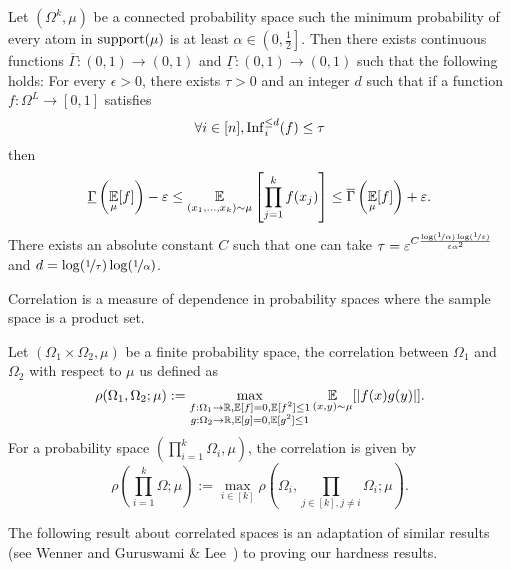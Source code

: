 \begin{theorem}

	\label{thm:invariance}
	Let $(\Omega^k, \mu)$ be a connected probability space such the minimum probability of
	every atom in $\supp(\mu)$ is at least $\alpha \in \left(0, \frac{1}{2}\right]$.
	 Then there exists 
	continuous functions $\overline{\Gamma} : (0,1)\rightarrow (0,1)$ and 
	$\underline{\Gamma} : (0,1)\rightarrow (0,1)$ such that the following holds: 
	For every $\epsilon>0$, there exists $\tau > 0$ and an integer $d$ such that 
	if a function $f : \Omega^L \rightarrow [0,1]$ satisfies
	$$\forall i\in [n],  \Inf_i^{\leq d} (f) \leq \tau $$
	then 
	$$\underline{\Gamma}\left(\E_\mu[f]\right) -\epsilon \leq \E_{(x_1,\ldots, x_k) \sim \mu}\left[
	\prod_{j=1}^k f(x_j)\right] \leq \overline{\Gamma}\left(\E_\mu[f]\right) + \epsilon.$$
	There exists an absolute constant $C$ such that one can take $\tau = \epsilon^
	{C\frac{\log(\nicefrac{1}{\alpha})\log(\nicefrac{1}{\epsilon})}{\epsilon
	\alpha^2}}$ and $d = \log(\nicefrac{1}{\tau})\log(\nicefrac{1}{\alpha})$.
\end{theorem}

Correlation is a measure of dependence in probability spaces where the sample space
is a product set.

\begin{definition}
\label{def:correlation}
Let $(\Omega_1 \times \Omega_2, \mu)$ be a finite probability space, the correlation between $\Omega_1$ and $\Omega_2$ with respect to $\mu$ us defined as 
$$\rho(\Omega_1, \Omega_2; \mu) := \mathop{\max}_{\substack{f : \Omega_1 \rightarrow \R, \E[f]  = 0 , \E[f^2]\leq 1 \\ g: \Omega_2 \rightarrow \R, \E[g] = 0 , \E[g^2]\leq 1} }  \E_{(x,y) \sim \mu }[ |f(x)g(y)|] .$$
For a probability space $\left(\prod_{i=1}^k\Omega_i, \mu\right)$, the correlation is given by
$$\rho\left(\prod_{i=1}^k\Omega; \mu\right) := \max_{i \in [k]} \rho\left( \Omega_i, \prod_{ j \in [k], j \neq i} \Omega_i; \mu\right).$$ 
\end{definition}

The following result about correlated spaces is an
adaptation of similar results (see Wenner
\cite[Theorem~3.12]{Wenner2013} and Guruswami \& 
Lee~\cite[Lemma~A.1]{GuruswamiL2015})   to proving
our hardness results.
 
